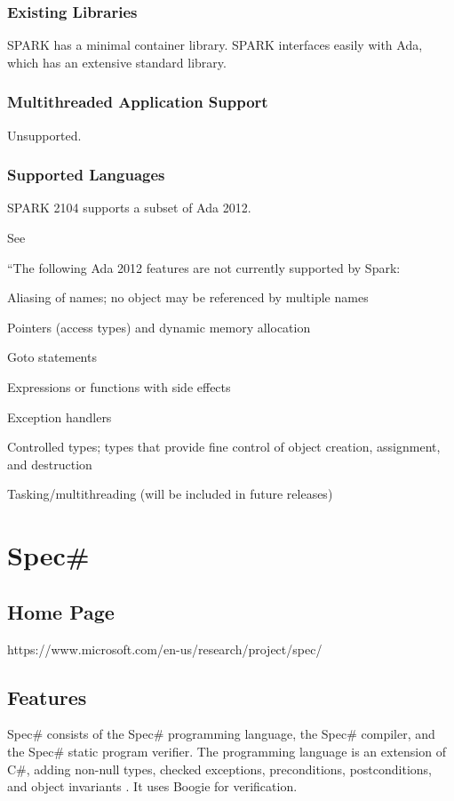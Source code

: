 \documentclass[12pt,openany,a4paper]{book}
\begin{document}
	\subsubsection{Existing Libraries}
	SPARK has a minimal container library. SPARK interfaces easily with Ada, which has an extensive standard library.

	\subsubsection{Multithreaded Application Support}
	Unsupported.

	\subsubsection{Supported Languages}
	SPARK 2104 supports a subset of Ada 2012.


	See \cite[p.18]{McCormickJohnW.2015Bhia}

	``The following Ada 2012 features are not currently supported by Spark:

	Aliasing of names; no object may be referenced by multiple names

	Pointers (access types) and dynamic memory allocation

	Goto statements

	Expressions or functions with side effects

	Exception handlers

	Controlled types; types that provide fine control of object creation, assignment, and destruction

	Tasking/multithreading (will be included in future releases)











\section{Spec\#}
	\subsection{Home Page}%
	https://www.microsoft.com/en-us/research/project/spec/
	\subsection{Features}
		Spec\# consists of the Spec\# programming language, the Spec\# compiler, and the Spec\# static program verifier. The programming language is an extension of C\#, adding non-null types, checked exceptions, preconditions, postconditions, and object invariants \cite{spec01}. It uses Boogie for verification.
\end{document}
